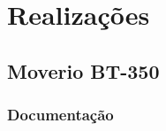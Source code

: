 \chapter{Realizações}\label{chp:realizacoes}

\section{Moverio BT-350}





\subsection{Documentação}

